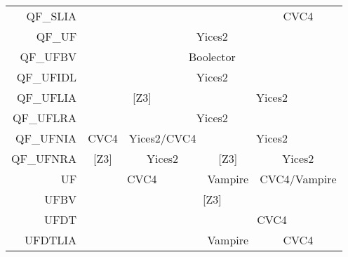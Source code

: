 \begin{table}
{\begin{tabular}{rcccc}
QF\_SLIA                         & \multicolumn{1}{l}{}          & \multicolumn{1}{l}{}                & \multicolumn{1}{l|}{}         & \multicolumn{1}{c|}{CVC4}             \\ \cline{2-5}
\multicolumn{1}{r|}{QF\_UF}      & \multicolumn{4}{c|}{Yices2}                                                                                                                 \\ \cline{2-5}
\multicolumn{1}{r|}{QF\_UFBV}    & \multicolumn{4}{c|}{Boolector}                                                                                                              \\ \cline{2-5}
\multicolumn{1}{r|}{QF\_UFIDL}   & \multicolumn{4}{c|}{Yices2}                                                                                                                 \\ \cline{2-5}
\multicolumn{1}{r|}{QF\_UFLIA}   & \multicolumn{2}{c|}{{[}Z3{]}}                                       & \multicolumn{2}{c|}{Yices2}                                           \\ \cline{2-5}
\multicolumn{1}{r|}{QF\_UFLRA}   & \multicolumn{4}{c|}{Yices2}                                                                                                                 \\ \cline{2-5}
\multicolumn{1}{r|}{QF\_UFNIA}   & \multicolumn{1}{c|}{CVC4}     & \multicolumn{1}{c|}{Yices2/CVC4}    & \multicolumn{2}{c|}{Yices2}                                           \\ \cline{2-5}
\multicolumn{1}{r|}{QF\_UFNRA}   & \multicolumn{1}{c|}{{[}Z3{]}} & \multicolumn{1}{c|}{Yices2}         & \multicolumn{1}{c|}{{[}Z3{]}} & \multicolumn{1}{c|}{Yices2}           \\ \cline{2-5}
\multicolumn{1}{r|}{UF}          & \multicolumn{2}{c|}{CVC4}                                           & \multicolumn{1}{c|}{Vampire}  & \multicolumn{1}{c|}{CVC4/Vampire}     \\ \cline{2-5}
\multicolumn{1}{r|}{UFBV}        & \multicolumn{4}{c|}{{[}Z3{]}}                                                                                                               \\ \cline{2-5}
UFDT                             & \multicolumn{1}{l}{}          & \multicolumn{1}{l|}{}               & \multicolumn{2}{c|}{CVC4}                                             \\ \cline{4-5}
UFDTLIA                          & \multicolumn{1}{l}{}          & \multicolumn{1}{l|}{}               & \multicolumn{1}{c|}{Vampire}  & \multicolumn{1}{c|}{CVC4}             \\ \cline{2-5}

\end{tabular}}
\end{table}
